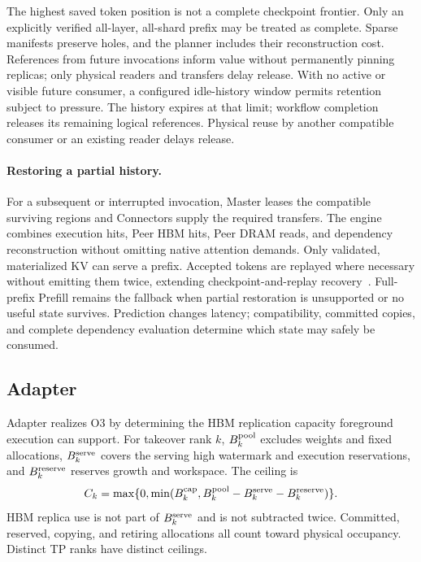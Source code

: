 The highest saved token position is not a complete checkpoint frontier.
Only an explicitly verified all-layer, all-shard prefix may be treated
as complete. Sparse manifests preserve holes, and the planner includes
their reconstruction cost. References from future invocations inform
value without permanently pinning replicas; only physical readers and transfers delay release.
With no active or visible future consumer, a configured idle-history
window permits retention subject to pressure. The history expires
at that limit; workflow completion releases its remaining logical references. Physical reuse
by another compatible consumer or an existing reader delays release.

\paragraph{Restoring a partial history.}
For a subsequent or interrupted invocation, Master leases the compatible
surviving regions and Connectors supply the required transfers. The
engine combines execution hits, Peer HBM hits, Peer DRAM reads, and
dependency reconstruction without omitting native attention demands.
Only validated, materialized KV can serve a prefix. Accepted tokens
are replayed where necessary without emitting them twice, extending
checkpoint-and-replay recovery~\cite{strati2024dejavu,cao2026lumen}.
Full-prefix Prefill remains the fallback when partial restoration is
unsupported or no useful state survives. Prediction changes latency;
compatibility, committed copies, and complete dependency evaluation
determine which state may safely be consumed.

\subsection{Adapter}
\label{sec:teacher-capacity}

Adapter realizes O3 by determining the HBM replication capacity
foreground execution can support. For takeover rank $k$,
$B^{\rm pool}_k$ excludes weights and fixed allocations,
$B^{\rm serve}_k$ covers the serving high watermark and execution
reservations, and $B^{\rm reserve}_k$ reserves growth and workspace.
The ceiling is
\begin{equation}
 C_k=\max\{0,\min(B^{\rm cap}_k,
 B^{\rm pool}_k-B^{\rm serve}_k-B^{\rm reserve}_k)\}.
 \label{eq:teacher-ceiling}
\end{equation}
HBM replica use is not part of $B^{\rm serve}_k$ and is not subtracted twice.
Committed, reserved, copying, and retiring allocations all count toward
physical occupancy. Distinct TP ranks have distinct ceilings.

